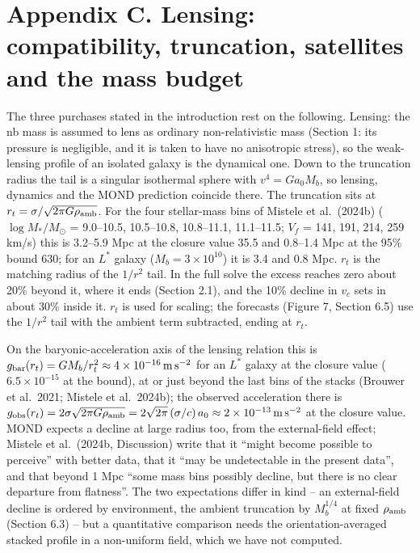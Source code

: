 \documentclass[
  10pt,
]{article}
\begin{document}
\section{Appendix C. Lensing: compatibility, truncation, satellites and the mass budget}\label{appendix-c.-lensing-compatibility-truncation-satellites-and-the-mass-budget}

The three purchases stated in the introduction rest on the following. Lensing: the nb mass is assumed to lens as ordinary non-relativistic mass (Section 1: its pressure is negligible, and it is taken to have no anisotropic stress), so the weak-lensing profile of an isolated galaxy is the dynamical one. Down to the truncation radius the tail is a singular isothermal sphere with $v^4=G a_0 M_b$, so lensing, dynamics and the MOND prediction coincide there. The truncation sits at $r_t=\sigma/\sqrt{2\pi G\rho_{\rm amb}}$. For the four stellar-mass bins of Mistele et al.~(2024b) ($\log M_*/M_\odot$ = 9.0--10.5, 10.5--10.8, 10.8--11.1, 11.1--11.5; $V_f$ = 141, 191, 214, 259 km/s) this is 3.2--5.9 Mpc at the closure value 35.5 and 0.8--1.4 Mpc at the 95\% bound 630; for an $L^*$ galaxy ($M_b=3\times10^{10}$) it is 3.4 and 0.8 Mpc. $r_t$ is the matching radius of the $1/r^2$ tail. In the full solve the excess reaches zero about 20\% beyond it, where it ends (Section 2.1), and the 10\% decline in $v_c$ sets in about 30\% inside it. $r_t$ is used for scaling; the forecasts (Figure 7, Section 6.5) use the $1/r^2$ tail with the ambient term subtracted, ending at $r_t$.

On the baryonic-acceleration axis of the lensing relation this is $g_{\rm bar}(r_t)=GM_b/r_t^2\approx 4\times10^{-16}\,{\rm m\,s^{-2}}$ for an $L^*$ galaxy at the closure value ($6.5\times10^{-15}$ at the bound), at or just beyond the last bins of the stacks (Brouwer et al.~2021; Mistele et al.~2024b); the observed acceleration there is $g_{\rm obs}(r_t)=2\sigma\sqrt{2\pi G\rho_{\rm amb}}=2\sqrt{2\pi}\,(\sigma/c)\,a_0\approx 2\times10^{-13}\,{\rm m\,s^{-2}}$ at the closure value. MOND expects a decline at large radius too, from the external-field effect; Mistele et al.~(2024b, Discussion) write that it ``might become possible to perceive'' with better data, that it ``may be undetectable in the present data'', and that beyond 1 Mpc ``some mass bins possibly decline, but there is no clear departure from flatness''. The two expectations differ in kind -- an external-field decline is ordered by environment, the ambient truncation by $M_b^{1/4}$ at fixed $\rho_{\rm amb}$ (Section 6.3) -- but a quantitative comparison needs the orientation-averaged stacked profile in a non-uniform field, which we have not computed.
\end{document}
